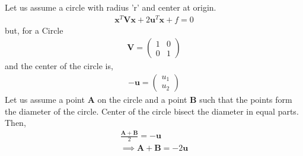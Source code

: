 \documentclass[journal,12pt,twocolumn]{article}
\let\vec\mathbf
\newcommand{\myvec}[1]{\ensuremath{\begin{pmatrix}#1\end{pmatrix}}}
\begin{document}
Let us assume a circle with radius 'r' and center at origin.\\
\begin{align}
	\boldsymbol{x}^{T}\boldsymbol{Vx} + 2\boldsymbol{u}^{T}\vec{x} + f = 0
\end{align}
but, for a Circle 
\begin{align}
	\boldsymbol{V} = \myvec{ 1 & 0 \\0 & 1}
\end{align}
and the center of the circle is,
\begin{align}
	-\vec{u} = \myvec{u_1 \\ u_2}
	\label{center}
\end{align}
Let us assume a point $\vec{A}$ on the circle and a point $\vec{B}$ such that the points form the diameter of the circle.
Center of the circle bisect the diameter in equal parts. Then,
\begin{eqnarray}
	\frac{\vec{A} + \vec{B}}{2} = -\vec{u} \\
	\implies \vec{A}+\vec{B} = -2\vec{u}
	\label{ab}
\end{eqnarray}
\end{document}
